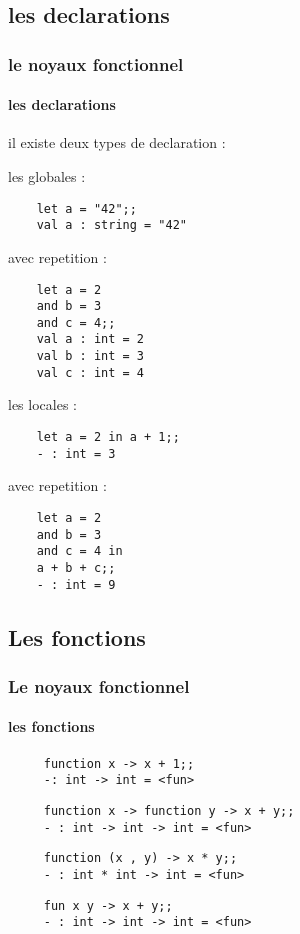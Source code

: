     \subsection{les declarations}
\begin{frame}[fragile]
      \frametitle{le noyaux fonctionnel}
      \framesubtitle{les declarations}
      il existe deux types de declaration :
     \begin{minipage}[t]{5cm}
	les globales :\\
	\begin{lstlisting}
	let a = "42";;
	val a : string = "42"
	\end{lstlisting}
	avec repetition :
	\begin{lstlisting}
	let a = 2
	and b = 3
	and c = 4;;
	val a : int = 2
	val b : int = 3
	val c : int = 4
	\end{lstlisting}
      \end{minipage}
      \begin{minipage}[t]{5cm}
	les locales :\\
	\begin{lstlisting}
	let a = 2 in a + 1;;
	- : int = 3
	\end{lstlisting}
	avec repetition :
	\begin{lstlisting}
	let a = 2
	and b = 3
	and c = 4 in
	a + b + c;;
	- : int = 9
	\end{lstlisting}
      \end{minipage}
\end{frame}
    \subsection{Les fonctions}
\begin{frame}[fragile]
      \frametitle{Le noyaux fonctionnel}
      \framesubtitle{les fonctions}
      \begin{minipage}[t]{7cm}
	\begin{center}
	\begin{itemize}
    \begin{lstlisting}
     function x -> x + 1;;
     -: int -> int = <fun>
    \end{lstlisting}
    \begin{lstlisting}
     function x -> function y -> x + y;;
     - : int -> int -> int = <fun>
    \end{lstlisting}
    \begin{lstlisting}
     function (x , y) -> x * y;;
     - : int * int -> int = <fun>
    \end{lstlisting}
   \begin{lstlisting}
     fun x y -> x + y;;
     - : int -> int -> int = <fun>
    \end{lstlisting}
  \end{itemize}
  \end{center}
  \end{minipage}
\end{frame}

